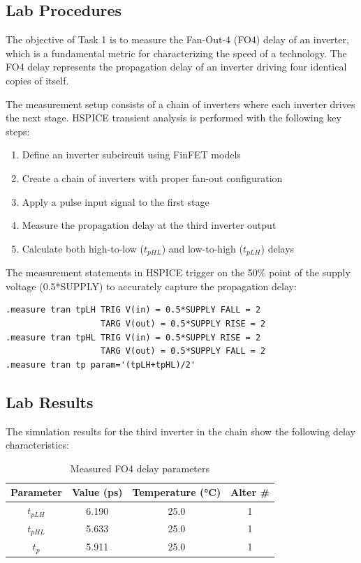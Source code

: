 \documentclass[UTF8,12pt,a4paper]{ctexart}
\begin{document}
\subsection{Lab Procedures}

The objective of Task 1 is to measure the Fan-Out-4 (FO4) delay of an inverter, which is a fundamental metric for characterizing the speed of a technology. The FO4 delay represents the propagation delay of an inverter driving four identical copies of itself.

The measurement setup consists of a chain of inverters where each inverter drives the next stage. HSPICE transient analysis is performed with the following key steps:

\begin{enumerate}
    \item Define an inverter subcircuit using FinFET models
    \item Create a chain of inverters with proper fan-out configuration
    \item Apply a pulse input signal to the first stage
    \item Measure the propagation delay at the third inverter output
    \item Calculate both high-to-low ($t_{pHL}$) and low-to-high ($t_{pLH}$) delays
\end{enumerate}

The measurement statements in HSPICE trigger on the 50\% point of the supply voltage (0.5*SUPPLY) to accurately capture the propagation delay:

\begin{verbatim}
.measure tran tpLH TRIG V(in) = 0.5*SUPPLY FALL = 2 
                   TARG V(out) = 0.5*SUPPLY RISE = 2
.measure tran tpHL TRIG V(in) = 0.5*SUPPLY RISE = 2 
                   TARG V(out) = 0.5*SUPPLY FALL = 2
.measure tran tp param='(tpLH+tpHL)/2'
\end{verbatim}

\subsection{Lab Results}

The simulation results for the third inverter in the chain show the following delay characteristics:

\begin{table}[h]
\centering
\begin{tabular}{|c|c|c|c|}
\hline
\textbf{Parameter} & \textbf{Value (ps)} & \textbf{Temperature (°C)} & \textbf{Alter \#} \\
\hline
$t_{pLH}$ & 6.190 & 25.0 & 1 \\
$t_{pHL}$ & 5.633 & 25.0 & 1 \\
$t_p$ & 5.911 & 25.0 & 1 \\
\hline
\end{tabular}
\caption{Measured FO4 delay parameters}
\end{table}
\end{document}
